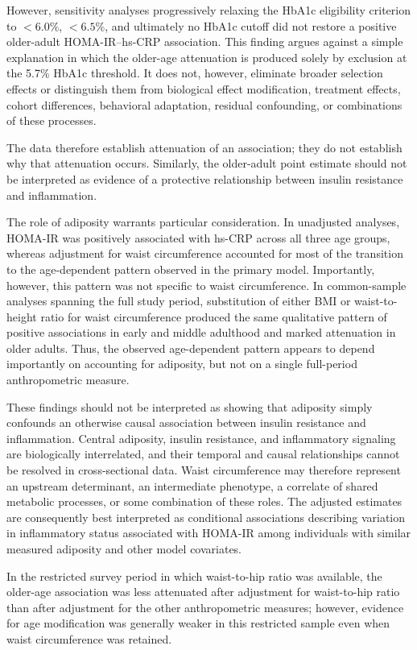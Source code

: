 \documentclass[11pt]{article}
\begin{document}
However, sensitivity analyses progressively relaxing the HbA1c eligibility
criterion to $<6.0\%$, $<6.5\%$, and ultimately no HbA1c cutoff did not
restore a positive older-adult HOMA-IR--hs-CRP association. This finding
argues against a simple explanation in which the older-age attenuation is
produced solely by exclusion at the 5.7\% HbA1c threshold. It does not,
however, eliminate broader selection effects or distinguish them from
biological effect modification, treatment effects, cohort differences,
behavioral adaptation, residual confounding, or combinations of these
processes.

The data therefore establish attenuation of an association; they do not
establish why that attenuation occurs. Similarly, the older-adult point
estimate should not be interpreted as evidence of a protective relationship
between insulin resistance and inflammation.

The role of adiposity warrants particular consideration. In unadjusted
analyses, HOMA-IR was positively associated with hs-CRP across all three
age groups, whereas adjustment for waist circumference accounted for most
of the transition to the age-dependent pattern observed in the primary
model. Importantly, however, this pattern was not specific to waist
circumference. In common-sample analyses spanning the full study period,
substitution of either BMI or waist-to-height ratio for waist circumference
produced the same qualitative pattern of positive associations in early
and middle adulthood and marked attenuation in older adults. Thus, the
observed age-dependent pattern appears to depend importantly on
accounting for adiposity, but not on a single full-period anthropometric
measure.

These findings should not be interpreted as showing that adiposity simply
confounds an otherwise causal association between insulin resistance and
inflammation. Central adiposity, insulin resistance, and inflammatory
signaling are biologically interrelated, and their temporal and causal
relationships cannot be resolved in cross-sectional data. Waist
circumference may therefore represent an upstream determinant, an
intermediate phenotype, a correlate of shared metabolic processes, or
some combination of these roles. The adjusted estimates are consequently
best interpreted as conditional associations describing variation in
inflammatory status associated with HOMA-IR among individuals with similar
measured adiposity and other model covariates.

In the restricted survey period in which waist-to-hip ratio was available,
the older-age association was less attenuated after adjustment for
waist-to-hip ratio than after adjustment for the other anthropometric
measures; however, evidence for age modification was generally weaker in
this restricted sample even when waist circumference was retained.
\end{document}
